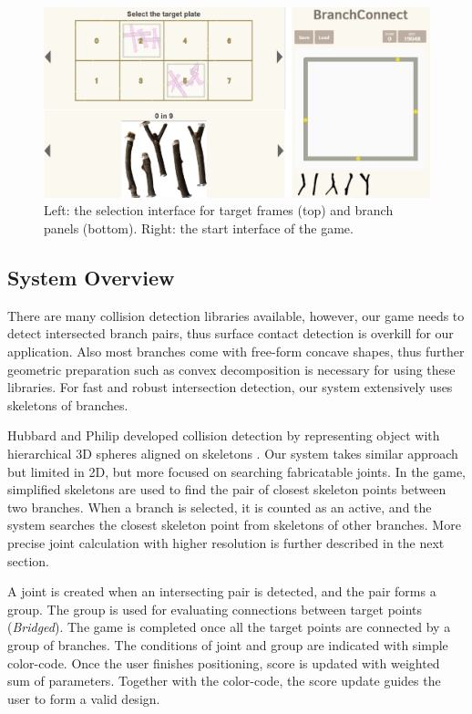 \begin{figure}[H]
  \begin{center}
    \includegraphics[width = 0.4\paperwidth]{images/interface/game_interface.png}
    \caption{Left: the selection interface for target frames (top) and branch panels (bottom). Right: the start interface of the game.}
    \label{fig:game_interface}
  \end{center}
\end{figure}
%
\subsection{System Overview}
There are many collision detection libraries available, however, our game needs to detect intersected branch pairs, thus surface contact detection is overkill for our application.
Also most branches come with free-form concave shapes, thus further geometric preparation such as convex decomposition is necessary for using these libraries.
For fast and robust intersection detection, our system extensively uses skeletons of branches.

Hubbard and Philip developed collision detection by representing object with hierarchical 3D spheres aligned on skeletons \cite{Hubbard:1996:APS:231731.231732}.
Our system takes similar approach but limited in 2D, but more focused on searching fabricatable joints.
In the game, simplified skeletons are used to find the pair of closest skeleton points between two branches.
When a branch is selected, it is counted as an active, and the system searches the closest skeleton point from skeletons of other branches.
More precise joint calculation with higher resolution is further described in the next section.

A joint is created when an intersecting pair is detected, and the pair forms a group.
The group is used for evaluating connections between target points (\textit{Bridged}).
The game is completed once all the target points are connected by a group of branches.
The conditions of joint and group are indicated with simple color-code.
Once the user finishes positioning, score is updated with weighted sum of parameters.
Together with the color-code, the score update guides the user to form a valid design.


